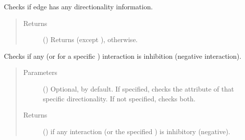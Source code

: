 \documentclass[letterpaper,10pt,english]{sphinxmanual}
\begin{document}
\begin{fulllineitems}
\begin{fulllineitems}
\label{\detokenize{reference:pypath.main.Direction.is_directed}}
Checks if edge has any directionality information.
\begin{quote}\begin{description}
\item[{Returns}] \leavevmode
() \textendash{} Returns  (except ),
 otherwise.

\end{description}\end{quote}

\end{fulllineitems}


\begin{fulllineitems}
\label{\detokenize{reference:pypath.main.Direction.is_inhibition}}
Checks if any (or for a specific ) interaction is
inhibition (negative interaction).
\begin{quote}\begin{description}
\item[{Parameters}] \leavevmode
{} () \textendash{} Optional,  by default. If specified, checks the
 attribute of that specific
directionality. If not specified, checks both.

\item[{Returns}] \leavevmode
() \textendash{}  if any interaction (or the specified
) is inhibitory (negative).

\end{description}\end{quote}

\end{fulllineitems}



\end{fulllineitems}
\end{document}
